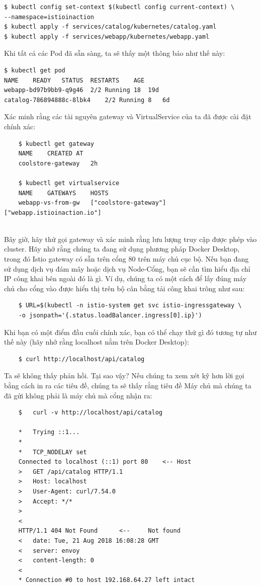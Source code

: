 \documentclass[12pt,a4paper]{report}
\begin{document}
\begin{lstlisting}
$ kubectl config set-context $(kubectl config current-context) \
--namespace=istioinaction
$ kubectl apply -f services/catalog/kubernetes/catalog.yaml
$ kubectl apply -f services/webapp/kubernetes/webapp.yaml
\end{lstlisting}

Khi tất cả các Pod đã sẵn sàng, ta sẽ thấy một thông báo như thế này:

\begin{lstlisting}
$ kubectl get pod
NAME	READY	STATUS	RESTARTS	AGE
webapp-bd97b9bb9-q9g46	2/2	Running	18	19d
catalog-786894888c-8lbk4	2/2	Running	8	6d
\end{lstlisting}

Xác minh rằng các tài nguyên gateway và VirtualService của ta đã được cài đặt chính xác:

\begin{lstlisting}
	$ kubectl get gateway
	NAME	CREATED AT
	coolstore-gateway	2h
	
	$ kubectl get virtualservice
	NAME	GATEWAYS	HOSTS
	webapp-vs-from-gw	["coolstore-gateway"]	["webapp.istioinaction.io"]
	
\end{lstlisting}
Bây giờ, hãy thử gọi gateway và xác minh rằng lưu lượng truy cập được phép vào cluster. Hãy nhớ rằng chúng ta đang sử dụng phương pháp Docker Desktop, trong đó  Istio gateway có sẵn trên cổng 80 trên máy chủ cục bộ. Nếu bạn đang sử dụng dịch vụ đám mây hoặc dịch vụ Node-Cổng, bạn sẽ cần tìm hiểu địa chỉ IP công khai bên ngoài đó là gì. Ví dụ, chúng ta có một cách để lấy đúng máy chủ cho cổng vào được hiển thị trên bộ cân bằng tải công khai trông như sau:
\begin{lstlisting}
	$ URL=$(kubectl -n istio-system get svc istio-ingressgateway \
	-o jsonpath='{.status.loadBalancer.ingress[0].ip}')
\end{lstlisting}

Khi bạn có một điểm đầu cuối chính xác, bạn có thể chạy thứ gì đó tương tự như thế này (hãy nhớ rằng localhost nằm trên Docker Desktop):
\begin{lstlisting}
	$ curl http://localhost/api/catalog
\end{lstlisting}

Ta sẽ không thấy phản hồi. Tại sao vậy? Nếu chúng ta xem xét kỹ hơn lời gọi bằng cách in ra các tiêu đề, chúng ta sẽ thấy rằng tiêu đề Máy chủ mà chúng ta đã gửi không phải là máy chủ mà cổng nhận ra:
\begin{lstlisting}
	$	curl -v http://localhost/api/catalog
	
	*	Trying ::1...	
	*
	*	TCP_NODELAY set
	Connected to localhost (::1) port 80	<--	Host
	>	GET /api/catalog HTTP/1.1	
	>	Host: localhost	
	>	User-Agent: curl/7.54.0	
	>	Accept: */*	
	>
	<	
	HTTP/1.1 404 Not Found		<-- 	Not found
	<	date: Tue, 21 Aug 2018 16:08:28 GMT	
	<	server: envoy	
	<	content-length: 0	
	<		
	* Connection #0 to host 192.168.64.27 left intact
	
\end{lstlisting}
\end{document}
